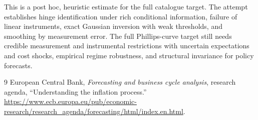 \documentclass[11pt]{article}
\theoremstyle{definition}
\begin{document}
This is a post hoc, heuristic estimate for the full catalogue target.
The attempt establishes hinge identification under rich conditional information, failure of linear instruments, exact Gaussian inversion with weak thresholds, and smoothing by measurement error. The full Phillips-curve target still needs credible measurement and instrumental restrictions with uncertain expectations and cost shocks, empirical regime robustness, and structural invariance for policy forecasts.

\begin{thebibliography}{9}
 European Central Bank, \emph{Forecasting and business cycle analysis}, research agenda, ``Understanding the inflation process.'' \url{https://www.ecb.europa.eu/pub/economic-research/research_agenda/forecasting/html/index.en.html}.
\end{thebibliography}
\end{document}
